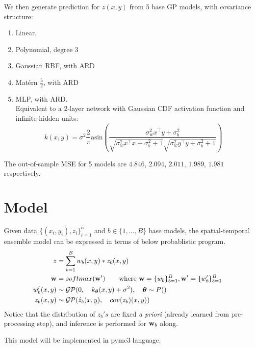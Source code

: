 \documentclass[11pt]{article}
\theoremstyle{definition}
\begin{document}
We then generate prediction for $z(x, y)$ from 5 base GP models, with covariance structure:
\begin{enumerate}
\item Linear, 
\item Polynomial, degree 3
\item Gaussian RBF, with ARD
\item Mat\'{e}rn $\frac{5}{2}$, with ARD
\item MLP, with ARD.\\ 
Equivalent to a 2-layer network with Gaussian CDF activation function and infinite hidden units:
$$k(x,y) = \sigma^{2}\frac{2}{\pi }  \text{asin} \left ( \frac{ \sigma_w^2 x^\top y+\sigma_b^2}{\sqrt{\sigma_w^2x^\top x + \sigma_b^2 + 1}\sqrt{\sigma_w^2 y^\top y + \sigma_b^2 +1}} \right )$$
\end{enumerate} 
The out-of-sample MSE for 5 models are $4.846$, $2.094$, $2.011$, $1.989$, $1.981$ respectively.

\section{\textbf{Model}}
Given data $\{(x_i, y_i), z_i\}_{i=1}^n$ and $b \in \{1, \dots, B\}$ base models, the spatial-temporal ensemble model can be expressed in terms of below probablistic program.
\begin{align*}
z &= \sum_{b=1}^B w_b(x, y) * z_b(x, y)\\
{\bf w} &= softmax({\bf w}') \qquad \mbox{where } {\bf w} = \{w_b\}_{b=1}^B, {\bf w}' = \{w'_b\}_{b=1}^B \\
w'_b(x, y) & \sim {\cal G}{\cal P}(0, \quad k_{\boldsymbol{\theta}}(x, y) + \sigma^2 ), \quad \boldsymbol{\theta} \sim P() \\
z_b(x, y) &\sim {\cal G}{\cal P}(\hat{z}_b(x, y), \quad cov(z_b)(x, y))
\end{align*}
Notice that the distribution of $z_b's$ are fixed \textit{a priori} (already learned from pre-processing step), and inference is performed for ${\bf w}_b$ along.

This model will be implemented in pymc3 language.
\end{document}
